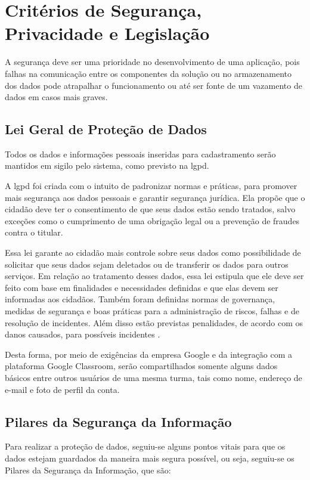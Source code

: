 \section {Critérios de Segurança, Privacidade e Legislação}
A segurança deve ser uma prioridade no desenvolvimento de uma aplicação, pois falhas na comunicação entre os componentes da solução ou no armazenamento dos dados pode atrapalhar o funcionamento ou até ser fonte de um vazamento de dados em casos mais graves. 

\subsection{Lei Geral de Proteção de Dados}
Todos os dados e informações pessoais inseridas para cadastramento serão mantidos em sigilo pelo sistema, como previsto na \ac{lgpd}.

A \ac{lgpd} foi criada com o intuito de padronizar normas e práticas, para promover mais segurança aos dados pessoais e garantir segurança jurídica. Ela propõe que o cidadão deve ter o consentimento de que seus dados estão sendo tratados, salvo exceções como o cumprimento de uma obrigação legal ou a prevenção de fraudes contra o titular.

Essa lei garante ao cidadão mais controle sobre seus dados como possibilidade de solicitar que seus dados sejam deletados ou de transferir os dados para outros serviços. Em relação ao tratamento desses dados, essa lei estipula que ele deve ser feito com base em finalidades e necessidades definidas e que elas devem ser informadas aos cidadãos. Também foram definidas normas de governança, medidas de segurança e boas práticas para a administração de riscos, falhas e de resolução de incidentes. Além disso estão previstas penalidades, de acordo com os danos causados, para possíveis incidentes \cite{lgpd-serpro:2018}.

Desta forma, por meio de exigências da empresa Google e da integração com a plataforma Google Classroom, serão compartilhados somente alguns dados básicos entre outros usuários de uma mesma turma, tais como nome, endereço de e-mail e foto de perfil da conta.

\subsection {Pilares da Segurança da Informação}
Para realizar a proteção de dados, seguiu-se alguns pontos vitais para que os dados estejam guardados da maneira mais segura possível, ou seja, seguiu-se os Pilares da Segurança da Informação, que são:

